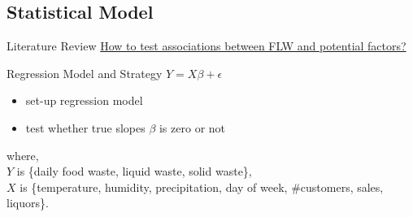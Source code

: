 \documentclass{beamer}
\newcommand\independent{\protect\mathpalette{\protect\independenT}{\perp}}
\def\independenT#1#2{\mathrel{\rlap{$#1#2$}\mkern2mu{#1#2}}}
\begin{document}
\subsection{Statistical Model}
\begin{frame}{Literature Review}
    \underline{How to test associations between FLW and potential factors?}
    \begin{block}{Regression Model and Strategy}
        \centering$Y = X\beta + \epsilon$\\
        \begin{itemize}
            \item set-up regression model
            \item test whether true slopes $\beta$ is zero or not
        \end{itemize}
    \end{block}
    where,\\
        $Y$ is \{daily food waste, liquid waste, solid waste\},\\
        $X$ is \{temperature, humidity, precipitation, day of week, \#customers, sales, liquors\}.
\end{frame}

\end{document}
